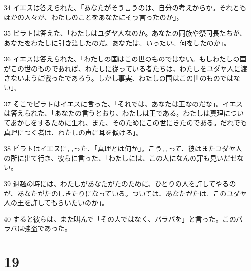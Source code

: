 \par 34 イエスは答えられた、「あなたがそう言うのは、自分の考えからか。それともほかの人々が、わたしのことをあなたにそう言ったのか」。
\par 35 ピラトは答えた、「わたしはユダヤ人なのか。あなたの同族や祭司長たちが、あなたをわたしに引き渡したのだ。あなたは、いったい、何をしたのか」。
\par 36 イエスは答えられた、「わたしの国はこの世のものではない。もしわたしの国がこの世のものであれば、わたしに従っている者たちは、わたしをユダヤ人に渡さないように戦ったであろう。しかし事実、わたしの国はこの世のものではない」。
\par 37 そこでピラトはイエスに言った、「それでは、あなたは王なのだな」。イエスは答えられた、「あなたの言うとおり、わたしは王である。わたしは真理についてあかしをするために生れ、また、そのためにこの世にきたのである。だれでも真理につく者は、わたしの声に耳を傾ける」。
\par 38 ピラトはイエスに言った、「真理とは何か」。こう言って、彼はまたユダヤ人の所に出て行き、彼らに言った、「わたしには、この人になんの罪も見いだせない。
\par 39 過越の時には、わたしがあなたがたのために、ひとりの人を許してやるのが、あなたがたのしきたりになっている。ついては、あなたがたは、このユダヤ人の王を許してもらいたいのか」。
\par 40 すると彼らは、また叫んで「その人ではなく、バラバを」と言った。このバラバは強盗であった。

\chapter{19}


